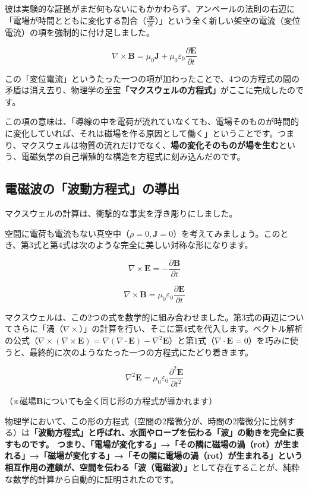 彼は実験的な証拠がまだ何もないにもかかわらず、アンペールの法則の右辺に「電場が時間とともに変化する割合（\(\frac{\partial \mathbf{E}}{\partial t}\)）」という全く新しい架空の電流（変位電流）の項を強制的に付け足しました。

\[
\nabla\times\mathbf{B}=\mu_0\mathbf{J}+\mu_0\varepsilon_0\frac{\partial\mathbf{E}}{\partial t}
\]

この「変位電流」というたった一つの項が加わったことで、4つの方程式の間の矛盾は消え去り、物理学の至宝\textbf{「マクスウェルの方程式」}がここに完成したのです。

この項の意味は、「導線の中を電荷が流れていなくても、電場そのものが時間的に変化していれば、それは磁場を作る原因として働く」ということです。つまり、マクスウェルは物質の流れだけでなく、\textbf{場の変化そのものが場を生む}という、電磁気学の自己増殖的な構造を方程式に刻み込んだのです。

\subsection{電磁波の「波動方程式」の導出}

マクスウェルの計算は、衝撃的な事実を浮き彫りにしました。

空間に電荷も電流もない真空中（\(\rho=0,\mathbf{J}=0\)）を考えてみましょう。このとき、第3式と第4式は次のような完全に美しい対称な形になります。

\[
\nabla\times\mathbf{E}=-\frac{\partial\mathbf{B}}{\partial t}
\]

\[
\nabla\times\mathbf{B}=\mu_0\varepsilon_0\frac{\partial\mathbf{E}}{\partial t}
\]

マクスウェルは、この2つの式を数学的に組み合わせました。第3式の両辺についてさらに「渦（\(\nabla\times\)）」の計算を行い、そこに第4式を代入します。ベクトル解析の公式（\(\nabla\times(\nabla\times\mathbf{E})=\nabla(\nabla\cdot\mathbf{E})-\nabla^2\mathbf{E}\)）と第1式（\(\nabla\cdot\mathbf{E}=0\)）を巧みに使うと、最終的に次のようなたった一つの方程式にたどり着きます。

\[
\nabla^2\mathbf{E}=\mu_0\varepsilon_0\frac{\partial^2\mathbf{E}}{\partial t^2}
\]

（※磁場\(\mathbf{B}\)についても全く同じ形の方程式が導かれます）

物理学において、この形の方程式（空間の2階微分が、時間の2階微分に比例する）は\textbf{「波動方程式」と呼ばれ、水面やロープを伝わる「波」の動きを完全に表すものです。 つまり、「電場が変化する」→「その隣に磁場の渦（rot）が生まれる」→「磁場が変化する」→「その隣に電場の渦（rot）が生まれる」という相互作用の連鎖が、空間を伝わる「波（電磁波）」}として存在することが、純粋な数学的計算から自動的に証明されたのです。

